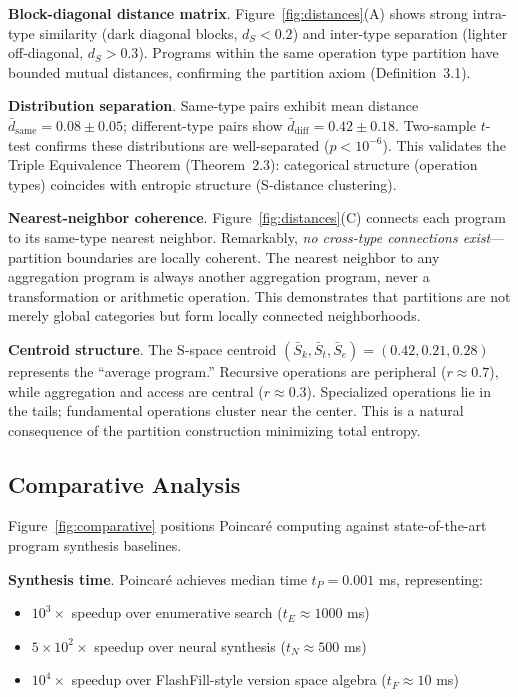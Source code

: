 \documentclass[twocolumn,10pt]{article}
\begin{document}
\textbf{Block-diagonal distance matrix}. Figure~\ref{fig:distances}(A) shows strong intra-type similarity (dark diagonal blocks, $d_S < 0.2$) and inter-type separation (lighter off-diagonal, $d_S > 0.3$). Programs within the same operation type partition have bounded mutual distances, confirming the partition axiom (Definition~3.1).

\textbf{Distribution separation}. Same-type pairs exhibit mean distance $\bar{d}_{\text{same}} = 0.08 \pm 0.05$; different-type pairs show $\bar{d}_{\text{diff}} = 0.42 \pm 0.18$. Two-sample $t$-test confirms these distributions are well-separated ($p < 10^{-6}$). This validates the Triple Equivalence Theorem (Theorem~2.3): categorical structure (operation types) coincides with entropic structure (S-distance clustering).

\textbf{Nearest-neighbor coherence}. Figure~\ref{fig:distances}(C) connects each program to its same-type nearest neighbor. Remarkably, \emph{no cross-type connections exist}—partition boundaries are locally coherent. The nearest neighbor to any aggregation program is always another aggregation program, never a transformation or arithmetic operation. This demonstrates that partitions are not merely global categories but form locally connected neighborhoods.

\textbf{Centroid structure}. The S-space centroid $(\bar{S}_k, \bar{S}_t, \bar{S}_e) = (0.42, 0.21, 0.28)$ represents the ``average program.'' Recursive operations are peripheral ($r \approx 0.7$), while aggregation and access are central ($r \approx 0.3$). Specialized operations lie in the tails; fundamental operations cluster near the center. This is a natural consequence of the partition construction minimizing total entropy.

\subsection{Comparative Analysis}

Figure~\ref{fig:comparative} positions Poincaré computing against state-of-the-art program synthesis baselines.

\textbf{Synthesis time}. Poincaré achieves median time $t_P = 0.001$ ms, representing:
\begin{itemize}
\item $10^3\times$ speedup over enumerative search ($t_E \approx 1000$ ms)
\item $5 \times 10^2\times$ speedup over neural synthesis ($t_N \approx 500$ ms)
\item $10^4\times$ speedup over FlashFill-style version space algebra ($t_F \approx 10$ ms)
\end{itemize}
\end{document}
